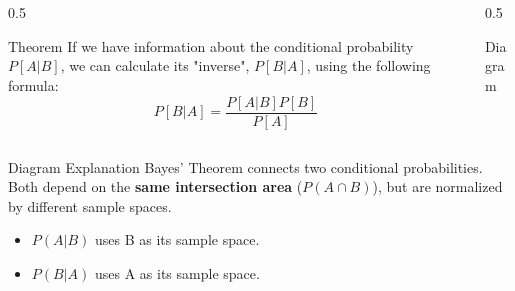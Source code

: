 \begin{frame}
    \frametitle{\ }
    \vspace{-7mm}
    \begin{columns}[T]
        \begin{column}{0.5\textwidth}
            \begin{block}{Theorem}
                If we have information about the conditional probability $P[A|B]$, we can calculate its "inverse", $P[B|A]$, using the following formula:
                \[
                  P[B|A] = \frac{P[A|B] P[B]}{P[A]}
                \]
            \end{block}
        \end{column}
        
        \begin{column}{0.5\textwidth}
            \begin{block}{Diagram}
                \centering
            \end{block}
        \end{column}
    \end{columns}
    \vspace{-1mm}
    \begin{block}{Diagram Explanation}
        Bayes' Theorem connects two conditional probabilities. Both depend on the \textbf{same intersection area} (\(P(A \cap B)\)), but are normalized by different sample spaces.
        \begin{itemize}
            \item \(P(A|B)\) uses B as its sample space.
            \item \(P(B|A)\) uses A as its sample space.
        \end{itemize}
    \end{block}
\end{frame}

